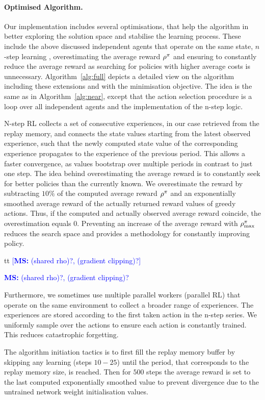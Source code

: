 \documentclass[envcountsame]{llncs}
\newcommand\MS[2][r]{\ifx t#1 \textcolor{blue}{[\textbf{MS:} #2]}
  \else \begin{center}\textcolor{blue}{\textbf{MS:} #2} \end{center} \fi}
\begin{document}
\paragraph*{Optimised Algorithm.}
Our implementation includes several optimisations, that help the algorithm in better exploring the
solution space and stabilise the learning process. These include the above discussed independent
agents that operate on the same state, \(n\)-step learning \citep{mnih2016asynchronous},
overestimating the average reward \(\rho^{\pi}\) and ensuring to constantly reduce the average
reward as searching for policies with higher average costs is unnecessary. Algorithm~\ref{alg:full}
depicts a detailed view on the algorithm including these extensions and with the minimisation
objective. The idea is the same as in Algorithm~\ref{alg:near}, except that the action selection
procedure is a loop over all independent agents and the implementation of the n-step logic.

N-step RL collects a set of consecutive experiences, in our case retrieved from the replay memory,
and connects the state values starting from the latest observed experience, such that the newly
computed state value of the corresponding experience propagates to the experience of the previous
period. This allows a faster convergence, as values bootstrap over multiple periods in contrast to
just one step.
The idea behind overestimating the average reward is to constantly seek for better policies than the
currently known. We overestimate the reward by subtracting \(10\%\) of the computed average reward
\(\rho^{\pi}\) and an exponentially smoothed average reward of the actually returned reward
values of greedy actions. Thus, if the computed and actually observed average reward coincide, the
overestimation equals \(0\).
Preventing an increase of the average reward with \(\rho_{\max}^{\pi}\) reduces the search space
and provides a methodology for constantly improving policy.

\MS[t]{(shared rho)?, (gradient clipping)?}

Furthermore, we sometimes use multiple parallel workers (parallel RL) that operate on the same
environment to collect a broader range of experiences. The experiences are stored according to the
first taken action in the n-step series. We uniformly sample over the actions to ensure each action
is constantly trained. This reduces catastrophic forgetting.

The algorithm initiation tactics is to first fill the replay memory buffer by skipping any learning
(steps \(10-25\)) until the period, that corresponds to the replay memory size, is reached. Then
for \(500\) steps the average reward is set to the last computed exponentially smoothed value to
prevent divergence due to the untrained network weight initialisation values.
\end{document}

